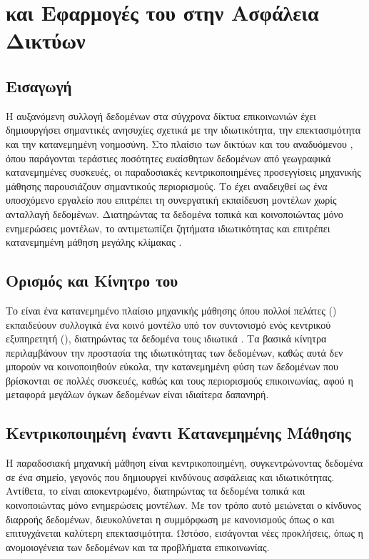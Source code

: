 \section{ και Εφαρμογές του στην Ασφάλεια Δικτύων}

\subsection{Εισαγωγή}

Η αυξανόμενη συλλογή δεδομένων στα σύγχρονα δίκτυα επικοινωνιών έχει δημιουργήσει σημαντικές ανησυχίες σχετικά με την ιδιωτικότητα, την επεκτασιμότητα και την κατανεμημένη νοημοσύνη. Στο πλαίσιο των δικτύων  και του αναδυόμενου , όπου παράγονται τεράστιες ποσότητες ευαίσθητων δεδομένων από γεωγραφικά κατανεμημένες συσκευές, οι παραδοσιακές κεντρικοποιημένες προσεγγίσεις μηχανικής μάθησης παρουσιάζουν σημαντικούς περιορισμούς. Το  έχει αναδειχθεί ως ένα υποσχόμενο εργαλείο που επιτρέπει τη συνεργατική εκπαίδευση μοντέλων χωρίς ανταλλαγή δεδομένων. Διατηρώντας τα δεδομένα τοπικά και κοινοποιώντας μόνο ενημερώσεις μοντέλων, το  αντιμετωπίζει ζητήματα ιδιωτικότητας και επιτρέπει κατανεμημένη μάθηση μεγάλης κλίμακας \cite{kairouz2021advances}.

\subsection{Ορισμός και Κίνητρο του }

Το  είναι ένα κατανεμημένο πλαίσιο μηχανικής μάθησης όπου πολλοί πελάτες () εκπαιδεύουν συλλογικά ένα κοινό μοντέλο υπό τον συντονισμό ενός κεντρικού εξυπηρετητή (), διατηρώντας τα δεδομένα τους ιδιωτικά \cite{mcmahan2017communication}. Τα βασικά κίνητρα περιλαμβάνουν την προστασία της ιδιωτικότητας των δεδομένων, καθώς αυτά δεν μπορούν να κοινοποιηθούν εύκολα, την κατανεμημένη φύση των δεδομένων που βρίσκονται σε πολλές συσκευές, καθώς και τους περιορισμούς επικοινωνίας, αφού η μεταφορά μεγάλων όγκων δεδομένων είναι ιδιαίτερα δαπανηρή.

\subsection{Κεντρικοποιημένη έναντι Κατανεμημένης Μάθησης}

Η παραδοσιακή μηχανική μάθηση είναι κεντρικοποιημένη, συγκεντρώνοντας δεδομένα σε ένα σημείο, γεγονός που δημιουργεί κινδύνους ασφάλειας και ιδιωτικότητας. Αντίθετα, το  είναι αποκεντρωμένο, διατηρώντας τα δεδομένα τοπικά και κοινοποιώντας μόνο ενημερώσεις μοντέλων. Με τον τρόπο αυτό μειώνεται ο κίνδυνος διαρροής δεδομένων, διευκολύνεται η συμμόρφωση με κανονισμούς όπως ο  και επιτυγχάνεται καλύτερη επεκτασιμότητα. Ωστόσο, εισάγονται νέες προκλήσεις, όπως η ανομοιογένεια των δεδομένων και τα προβλήματα επικοινωνίας.

